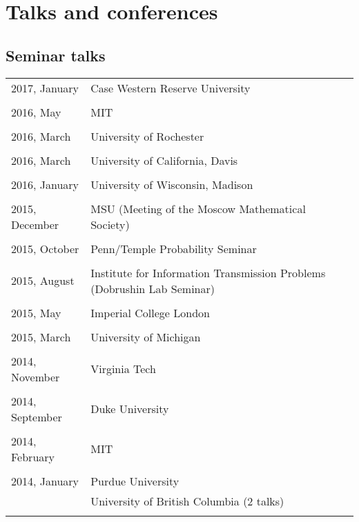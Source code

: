 \documentclass[letterpaper,11pt]{article}
\begin{document}
\section*{Talks and conferences}

\subsection*{Seminar talks}

\begin{longtable}{llc}
	2017, January
	& Case Western Reserve University
	\\\\
	2016, May
	& MIT
	\\\\
	2016, March
	& University of Rochester
	\\\\
	2016, March
	& University of California, Davis
	\\\\
	2016, January
	& University of Wisconsin, Madison
	\\\\
	2015, December
	& MSU (Meeting of the Moscow Mathematical Society)
	\\\\
	2015, October
	& Penn/Temple Probability Seminar
	\\\\

	2015, August
	& Institute for Information Transmission Problems
	(Dobrushin Lab Seminar)
	\\\\

	2015, May
	& Imperial College London
	\\\\

	2015, March
	& University of Michigan
	\\\\

	2014, November
	& Virginia Tech\\\\

	2014, September
	& Duke University\\\\

	2014, February
	& MIT\\\\

	2014, January
	  & Purdue University & \hspace{110pt}
	\\& University of British Columbia (2 talks)\\\\


\end{longtable}
\end{document}
